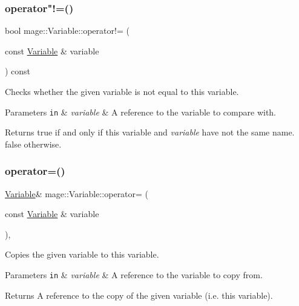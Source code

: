 \subsubsection{\texorpdfstring{operator"!=()}{operator!=()}}
{\footnotesize\ttfamily bool mage\+::\+Variable\+::operator!= (\begin{DoxyParamCaption}\item[{const \hyperlink{structmage_1_1_variable}{Variable} \&}]{variable }\end{DoxyParamCaption}) const}

Checks whether the given variable is not equal to this variable.


\begin{DoxyParams}[1]{Parameters}
\mbox{\tt in}  & {\em variable} & A reference to the variable to compare with. \\
\hline
\end{DoxyParams}
\begin{DoxyReturn}{Returns}
{\ttfamily true} if and only if this variable and {\itshape variable} have not the same name. {\ttfamily false} otherwise. 
\end{DoxyReturn}
\hypertarget{structmage_1_1_variable_a99029d04b45f356b9681787fdab8a139}{}\label{structmage_1_1_variable_a99029d04b45f356b9681787fdab8a139} 
\subsubsection{\texorpdfstring{operator=()}{operator=()}\hspace{0.1cm}{\footnotesize\ttfamily [1/2]}}
{\footnotesize\ttfamily \hyperlink{structmage_1_1_variable}{Variable}\& mage\+::\+Variable\+::operator= (\begin{DoxyParamCaption}\item[{const \hyperlink{structmage_1_1_variable}{Variable} \&}]{variable }\end{DoxyParamCaption})\hspace{0.3cm}{\ttfamily [private]}, {\ttfamily [delete]}}

Copies the given variable to this variable.


\begin{DoxyParams}[1]{Parameters}
\mbox{\tt in}  & {\em variable} & A reference to the variable to copy from. \\
\hline
\end{DoxyParams}
\begin{DoxyReturn}{Returns}
A reference to the copy of the given variable (i.\+e. this variable). 
\end{DoxyReturn}
\hypertarget{structmage_1_1_variable_a3918cb719332c752205a805d0025a775}{}\label{structmage_1_1_variable_a3918cb719332c752205a805d0025a775} 
